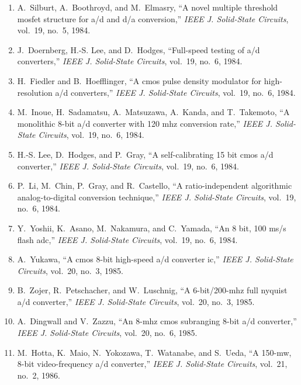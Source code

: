 \begin{enumerate}
\item
A.~Silburt, A.~Boothroyd, and M.~Elmasry, ``A novel multiple threshold mosfet
  structure for a/d and d/a conversion,'' \emph{{IEEE} J. Solid-State
  Circuits}, vol.~19, no.~5, 1984.

\item
J.~Doernberg, H.-S. Lee, and D.~Hodges, ``Full-speed testing of a/d
  converters,'' \emph{{IEEE} J. Solid-State Circuits}, vol.~19, no.~6, 1984.

\item
H.~Fiedler and B.~Hoefflinger, ``A cmos pulse density modulator for
  high-resolution a/d converters,'' \emph{{IEEE} J. Solid-State Circuits},
  vol.~19, no.~6, 1984.

\item
M.~Inoue, H.~Sadamatsu, A.~Matsuzawa, A.~Kanda, and T.~Takemoto, ``A monolithic
  8-bit a/d converter with 120 mhz conversion rate,'' \emph{{IEEE} J.
  Solid-State Circuits}, vol.~19, no.~6, 1984.

\item
H.-S. Lee, D.~Hodges, and P.~Gray, ``A self-calibrating 15 bit cmos a/d
  converter,'' \emph{{IEEE} J. Solid-State Circuits}, vol.~19, no.~6, 1984.

\item
P.~Li, M.~Chin, P.~Gray, and R.~Castello, ``A ratio-independent algorithmic
  analog-to-digital conversion technique,'' \emph{{IEEE} J. Solid-State
  Circuits}, vol.~19, no.~6, 1984.

\item
Y.~Yoshii, K.~Asano, M.~Nakamura, and C.~Yamada, ``An 8 bit, 100 ms/s flash
  adc,'' \emph{{IEEE} J. Solid-State Circuits}, vol.~19, no.~6, 1984.

\item
A.~Yukawa, ``A cmos 8-bit high-speed a/d converter ic,'' \emph{{IEEE} J.
  Solid-State Circuits}, vol.~20, no.~3, 1985.

\item
B.~Zojer, R.~Petschacher, and W.~Luschnig, ``A 6-bit/200-mhz full nyquist a/d
  converter,'' \emph{{IEEE} J. Solid-State Circuits}, vol.~20, no.~3, 1985.

\item
A.~Dingwall and V.~Zazzu, ``An 8-mhz cmos subranging 8-bit a/d converter,''
  \emph{{IEEE} J. Solid-State Circuits}, vol.~20, no.~6, 1985.

\item
M.~Hotta, K.~Maio, N.~Yokozawa, T.~Watanabe, and S.~Ueda, ``A 150-mw, 8-bit
  video-frequency a/d converter,'' \emph{{IEEE} J. Solid-State Circuits},
  vol.~21, no.~2, 1986.


\end{enumerate}

